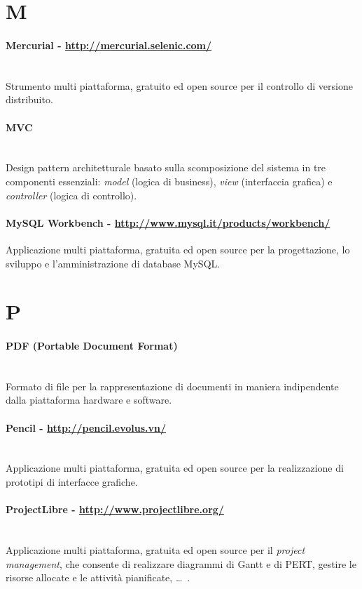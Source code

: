 \section*{M}
\paragraph{Mercurial - \url{http://mercurial.selenic.com/}} \hfill \\
Strumento multi piattaforma, gratuito ed open source per il controllo di versione distribuito.
\pagebreak
\paragraph{MVC} \hfill \\
Design pattern architetturale basato sulla scomposizione del sistema in tre componenti essenziali: \textit{model} (logica di business), \textit{view} (interfaccia grafica) e \textit{controller} (logica di controllo).
\paragraph{MySQL Workbench - \url{http://www.mysql.it/products/workbench/}}
Applicazione multi piattaforma, gratuita ed open source per la progettazione, lo sviluppo e l'amministrazione di database MySQL.

\section*{P}
\paragraph{PDF (Portable Document Format)} \hfill \\
Formato di file per la rappresentazione di documenti in maniera indipendente dalla piattaforma hardware e software.
\paragraph{Pencil - \url{http://pencil.evolus.vn/}} \hfill \\
Applicazione multi piattaforma, gratuita ed open source per la realizzazione di prototipi di interfacce grafiche.
\paragraph{ProjectLibre - \url{http://www.projectlibre.org/}} \hfill \\
Applicazione multi piattaforma, gratuita ed open source per il \textit{project management}, che consente di realizzare diagrammi di Gantt e di PERT, gestire le risorse allocate e le attività pianificate, \ldots\ .

